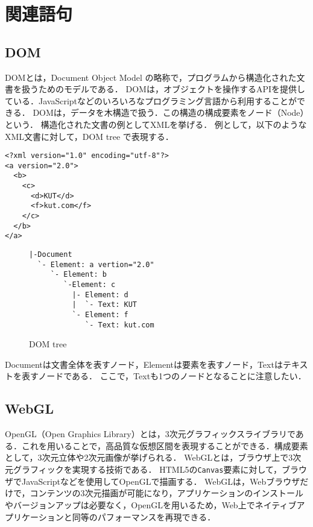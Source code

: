 \section{関連語句}
\subsection{DOM}
DOMとは，Document Object Model の略称で，プログラムから構造化された文書を扱うためのモデルである．
DOMは，オブジェクトを操作するAPIを提供している．JavaScriptなどのいろいろなプログラミング言語から利用することができる．
DOMは，データを木構造で扱う．この構造の構成要素をノード（Node）という．
構造化された文書の例としてXMLを挙げる．
例として，以下のようなXML文書に対して，DOM tree で表現する．
\begin{lstlisting}[caption={XML文書}]
<?xml version="1.0" encoding="utf-8"?>
<a version="2.0">
  <b>
    <c>
      <d>KUT</d>
      <f>kut.com</f>
    </c>
  </b>
</a>
\end{lstlisting}
\begin{figure}[H]
    \begin{framed}
        \centering
        \begin{verbatim}
|-Document
  `- Element: a vertion="2.0"
     `- Element: b
        `-Element: c
          |- Element: d
          |  `- Text: KUT
          `- Element: f   
             `- Text: kut.com
\end{verbatim}
    \end{framed}
    \caption{DOM tree}
\end{figure}
Documentは文書全体を表すノード，Elementは要素を表すノード，Textはテキストを表すノードである．
ここで，Textも1つのノードとなることに注意したい．
\\\hfill\cite{XML文書とDOM}
\subsection{WebGL}
OpenGL（Open Graphics Library）とは，3次元グラフィックスライブラリである．これを用いることで，高品質な仮想区間を表現することができる．構成要素として，3次元立体や2次元画像が挙げられる\cite{OpenGL入門}．
WebGLとは，ブラウザ上で3次元グラフィックを実現する技術である．
HTML5の\texttt{Canvas}要素に対して，ブラウザでJavaScriptなどを使用してOpenGLで描画する．
WebGLは，Webブラウザだけで，コンテンツの3次元描画が可能になり，アプリケーションのインストールやバージョンアップは必要なく，OpenGLを用いるため，Web上でネイティブアプリケーションと同等のパフォーマンスを再現できる．
\\\hfill\cite{webglみずほ}
